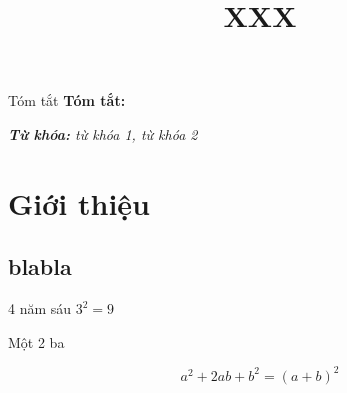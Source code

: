 \documentclass{uetgraduation}
\begin{document}
\title{XXX}


\makecovers


    


\begin{preamble}{Tóm tắt}
    \textbf{Tóm tắt:} 
    
    \textit{\textbf{Từ khóa:} từ khóa 1, từ khóa 2}
\end{preamble}

\chapter{Giới thiệu}
\section{blabla}

\begin{center}
4 năm sáu $3^2 = 9$
\end{center}
Một 2 ba

\begin{equation*}
    a^2 + 2ab + b^2 = (a+b)^2
\end{equation*}
\end{document}
